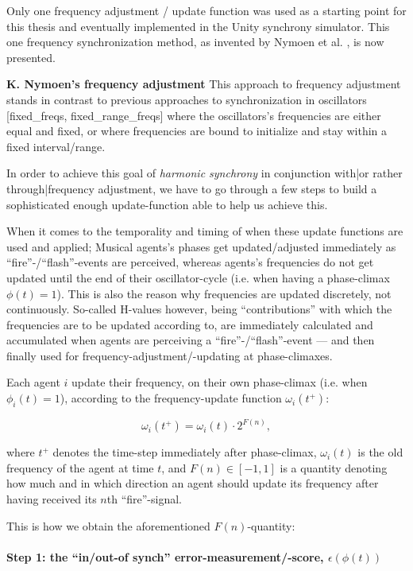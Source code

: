 Only one frequency adjustment / update function was used as a starting point for this thesis and eventually implemented in the Unity synchrony simulator. This one frequency synchronization method, as invented by Nymoen et al. \cite{nymoen_synch}, is now presented. \nl

\textbf{K. Nymoen's frequency adjustment} \nl
This approach to frequency adjustment stands in contrast to previous approaches to synchronization in oscillators [fixed\_freqs, fixed\_range\_freqs] where the oscillators's frequencies are either equal and fixed, or where frequencies are bound to initialize and stay within a fixed interval/range.

In order to achieve this goal of \textit{harmonic synchrony} in conjunction with|or rather through|frequency adjustment, we have to go through a few steps to build a sophisticated enough update-function able to help us achieve this.

When it comes to the temporality and timing of when these update functions are used and applied; Musical agents's phases get updated/adjusted immediately as ``fire''-/``flash''-events are perceived, whereas agents's frequencies do not get updated until the end of their oscillator-cycle (i.e. when having a phase-climax $\phi(t)=1$). This is also the reason why frequencies are updated discretely, not continuously. So-called H-values however, being ``contributions'' with which the frequencies are to be updated according to, are immediately calculated and accumulated when agents are perceiving a ``fire''-/``flash''-event — and then finally used for frequency-adjustment/-updating at phase-climaxes.
		
Each agent $i$ update their frequency, on their own phase-climax (i.e. when $\phi_i(t)=1$), according to the frequency-update function $\omega_i(t^+)$:

\begin{equation}
	\omega_i(t^+) = \omega_i(t) \cdot 2^{F(n)},
\end{equation}

where $t^+$ denotes the time-step immediately after phase-climax, $\omega_i(t)$ is the old frequency of the agent at time $t$, and $F(n) \in [-1,1]$ is a quantity denoting how much and in which direction an agent should update its frequency after having received its $n$th ``fire''-signal.

This is how we obtain the aforementioned $F(n)$-quantity:

	\paragraph{Step 1: the ``in/out-of synch'' error-measurement/-score, $\epsilon(\phi(t))$}

